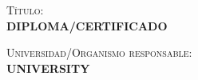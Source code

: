 
\newcommand{\titulopostgrado}[2]{
\cleardoublepage
\vspace*{10cm}
\textsc{Título}:\\[5pt]
\uppercase{\textbf{#1}}\\
\bigskip

\textsc{Universidad/Organismo responsable}:\\
\uppercase{\textbf{#2}}\\
\cleardoublepage
}

\titulopostgrado{Diploma/Certificado}{University}

%




